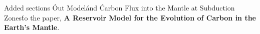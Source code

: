 Added sections \'Out Model\' and \'Carbon Flux into the Mantle at Subduction Zones\' to the paper, \textbf{A Reservoir Model for the Evolution of Carbon in the Earth's Mantle}.
